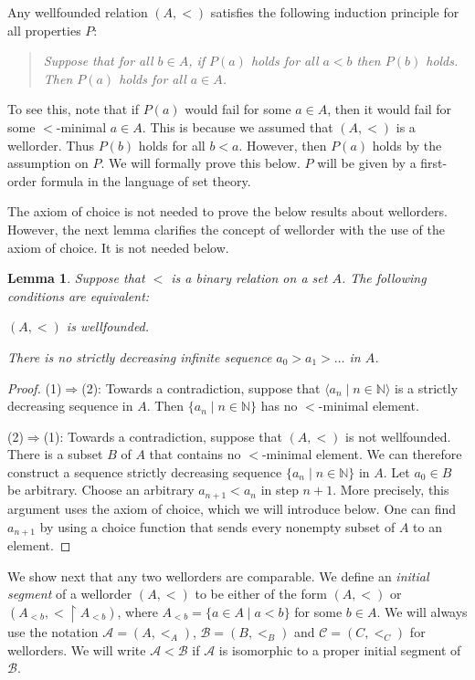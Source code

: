 \documentclass[a4paper, 11pt]{amsart}
\newtheorem{lemma}[lemma]{Lemma}
\theoremstyle{remark}
\newcommand{\NN}{\mathbb{N}}
\newcommand{\cB}{\mathcal B}
\newcommand{\cA}{\mathcal A}
\newcommand{\cC}{\mathcal C}
\newenvironment{enumerate-(1)}{\begin{enumerate}[label={\upshape (\arabic*)}, leftmargin=2pc]}{\end{enumerate}}
\begin{document}
Any wellfounded relation $(A,<)$ satisfies the following induction principle for all properties $P$: 

\begin{quote} 
\emph{Suppose that for all $b\in A$, if $P(a)$ holds for all $a<b$ then $P(b)$ holds. 
Then $P(a)$ holds for all $a\in A$. } 
\end{quote} 

To see this, note that if $P(a)$ would fail for some $a\in A$, then it would fail for some $<$-minimal $a\in A$. 
This is because we assumed that $(A,<)$ is a wellorder. 
Thus $P(b)$ holds for all $b<a$. 
However, then $P(a)$ holds by the assumption on $P$. 
We will formally prove this below. $P$ will be given by a first-order formula in the language of set theory. 

The axiom of choice is not needed to prove the below results about wellorders. 
However, the next lemma clarifies the concept of wellorder with the use of the axiom of choice. 
It is not needed below. 


\begin{lemma} 
Suppose that $<$ is a binary relation on a set $A$. 
The following conditions are equivalent: 
\begin{enumerate-(1)} 
\item 
$(A,<)$ is wellfounded. 
\item 
There is no strictly decreasing infinite sequence $a_0>a_1>\dots$ in $A$. 
\end{enumerate-(1)} 
\end{lemma} 
\begin{proof} 
(1)$\Rightarrow$(2): 
Towards a contradiction, suppose that $\langle a_n \mid n\in \NN\rangle$ is a strictly decreasing sequence in $A$. 
Then $\{a_n \mid n\in\NN\}$ has no $<$-minimal element. 

(2)$\Rightarrow$(1): 
Towards a contradiction, suppose that $(A,<)$ is not wellfounded. 
There is a subset $B$ of $A$ that contains no $<$-minimal element. 
We can therefore construct a sequence  strictly decreasing sequence $\{a_n \mid n\in\NN\}$ in $A$. 
Let $a_0\in B$ be arbitrary. 
Choose an arbitrary $a_{n+1}<a_n$ in step $n+1$. 
More precisely, this argument uses the axiom of choice, which we will introduce below. 
One can find $a_{n+1}$ by using a choice function that sends every nonempty subset of $A$ to an element.  
\end{proof} 

We show next that any two wellorders are comparable. 
We define an \emph{initial segment} of a wellorder $(A,<)$ to be either of the form $(A,<)$ or $(A_{<b},<{\upharpoonright}A_{<b})$, where $A_{<b}= \{ a\in A\mid a<b \}$ for some $b\in A$. 
We will always use the notation $\cA=(A,<_A)$, $\cB=(B,<_B)$ and $\cC=(C,<_C)$ for wellorders. 
We will write $\cA < \cB$ if $\cA$ is isomorphic to a proper initial segment of $\cB$. 
\end{document}
